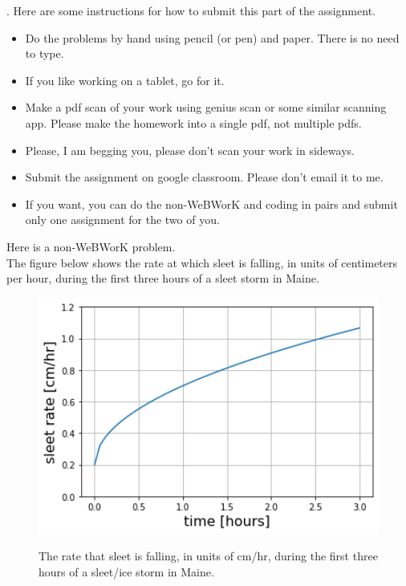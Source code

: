 \documentclass[12pt]{article}
\begin{document}
.  Here are some
instructions for how to submit this part of the assignment.
\begin{itemize}
  \setlength{\itemsep}{-1mm}
\item Do the problems by hand using pencil (or pen) and paper.
  There is no need to type.
\item If you like working on a tablet, go for it. 
\item Make a pdf scan of your work using genius scan or some
  similar scanning app.  Please make the homework into a single
  pdf, not multiple pdfs.
\item Please, I am begging you, please don't scan your work in
    sideways. \smiley{}
\item Submit the assignment on google classroom.  Please don't
  email it to me.  %
\item If you want, you can do the non-WeBWorK and coding in pairs and
  submit only one assignment for the two of you. \\
\end{itemize}

\noindent Here is a non-WeBWorK problem.\\

\noindent The figure below shows the rate at which sleet is falling,
in units of centimeters per hour, during the first three hours of a
sleet storm in Maine. 


\begin{figure}[h]
\begin{center}
\vspace{1mm}
\includegraphics[width=6.5in]{sleet.png}
\vspace{-1mm}
\caption{The rate that sleet is falling, in units of cm/hr, during the
  first three hours of a sleet/ice storm in Maine.}
\vspace{-5mm}
\label{fig:graph1}
\end{center}
\end{figure}
\end{document}
